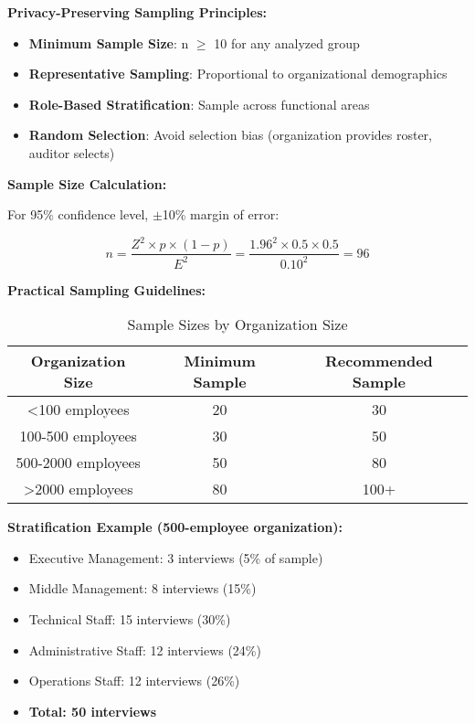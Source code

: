 \documentclass[11pt,a4paper]{article}
\begin{document}
\textbf{Privacy-Preserving Sampling Principles:}

\begin{itemize}
\item \textbf{Minimum Sample Size}: n $\geq$ 10 for any analyzed group
\item \textbf{Representative Sampling}: Proportional to organizational demographics
\item \textbf{Role-Based Stratification}: Sample across functional areas
\item \textbf{Random Selection}: Avoid selection bias (organization provides roster, auditor selects)
\end{itemize}

\textbf{Sample Size Calculation:}

For 95\% confidence level, $\pm$10\% margin of error:

\begin{equation}
n = \frac{Z^2 \times p \times (1-p)}{E^2} = \frac{1.96^2 \times 0.5 \times 0.5}{0.10^2} = 96
\end{equation}

\textbf{Practical Sampling Guidelines:}

\begin{table}[h]
\centering
\caption{Sample Sizes by Organization Size}
\begin{tabular}{ccc}
\toprule
\textbf{Organization Size} & \textbf{Minimum Sample} & \textbf{Recommended Sample} \\
\midrule
<100 employees & 20 & 30 \\
100-500 employees & 30 & 50 \\
500-2000 employees & 50 & 80 \\
>2000 employees & 80 & 100+ \\
\bottomrule
\end{tabular}
\end{table}

\textbf{Stratification Example (500-employee organization):}

\begin{itemize}
\item Executive Management: 3 interviews (5\% of sample)
\item Middle Management: 8 interviews (15\%)
\item Technical Staff: 15 interviews (30\%)
\item Administrative Staff: 12 interviews (24\%)
\item Operations Staff: 12 interviews (26\%)
\item \textbf{Total: 50 interviews}
\end{itemize}
\end{document}
